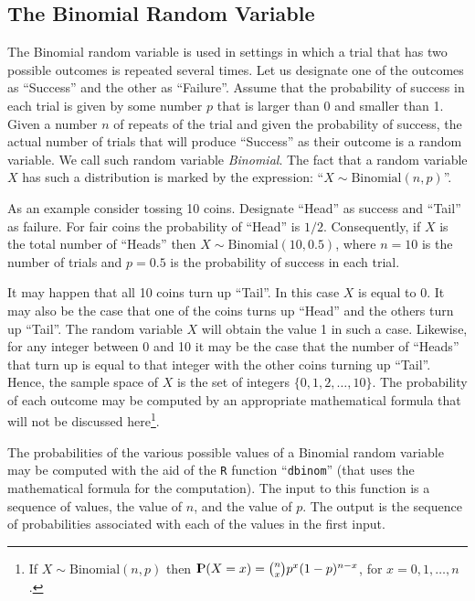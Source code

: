\documentclass[]{krantz}
\newcommand{\Prob}{{\rm I\kern-.3em P}}
\theoremstyle{definition}
\theoremstyle{definition}
\theoremstyle{definition}
\theoremstyle{remark}
\begin{document}
\hypertarget{the-binomial-random-variable}{%
\subsection{The Binomial Random Variable}\label{the-binomial-random-variable}}

The Binomial random variable is used in settings in which a trial that
has two possible outcomes is repeated several times. Let us designate
one of the outcomes as ``Success'' and the other as ``Failure''. Assume that
the probability of success in each trial is given by some number \(p\)
that is larger than 0 and smaller than 1. Given a number \(n\) of repeats
of the trial and given the probability of success, the actual number of
trials that will produce ``Success'' as their outcome is a random
variable. We call such random variable \emph{Binomial}. The fact that a
random variable \(X\) has such a distribution is marked by the expression:
``\(X \sim \mathrm{Binomial}(n,p)\)''.

As an example consider tossing 10 coins. Designate ``Head'' as success and
``Tail'' as failure. For fair coins the probability of ``Head'' is \(1/2\).
Consequently, if \(X\) is the total number of ``Heads'' then
\(X \sim \mathrm{Binomial}(10,0.5)\), where \(n=10\) is the number of trials
and \(p=0.5\) is the probability of success in each trial.

It may happen that all 10 coins turn up ``Tail''. In this case \(X\) is
equal to 0. It may also be the case that one of the coins turns up
``Head'' and the others turn up ``Tail''. The random variable \(X\) will
obtain the value 1 in such a case. Likewise, for any integer between 0
and 10 it may be the case that the number of ``Heads'' that turn up is
equal to that integer with the other coins turning up ``Tail''. Hence, the
sample space of \(X\) is the set of integers \(\{0, 1, 2, \ldots, 10\}\).
The probability of each outcome may be computed by an appropriate
mathematical formula that will not be discussed here\footnote{If \(X\sim \mathrm{Binomial}(n,p)\) then
  \(\Prob(X = x) = {n \choose x} p^x (1-p)^{n-x}\), for
  \(x = 0, 1, \ldots, n\).}.

The probabilities of the various possible values of a Binomial random
variable may be computed with the aid of the \texttt{R} function ``\texttt{dbinom}''
(that uses the mathematical formula for the computation). The input to
this function is a sequence of values, the value of \(n\), and the value
of \(p\). The output is the sequence of probabilities associated with each
of the values in the first input.
\end{document}
